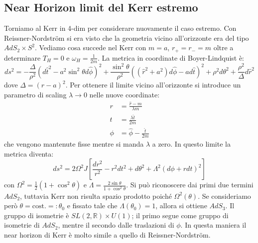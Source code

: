 \subsection{Near Horizon limit del Kerr estremo}
Torniamo al Kerr in 4-dim per considerare nuovamente il caso estremo. Con Reissner-Nordstr\"om si era visto che la geometria vicino all'orizzonte era del tipo $AdS_2 \times S^2$. Vediamo cosa succede nel Kerr con $m=a$, $r_+ =r_-= m$ oltre a determinare $T_H = 0$ e $\omega_H = \frac{1}{2m}$. La metrica in coordinate di Boyer-Lindquist è:
\begin{equation*}
    ds^2 = - \frac{\Delta}{\rho^2}\left(d\hat{t}^2 -a^2 \sin^2\theta d\hat{\phi}\right)^2 + \frac{\sin^2\theta}{\rho^2}\left((\hat{r}^2 + a^2)d\hat{\phi} - ad\hat{t} \right)^2 + \rho^2 d\theta^2 + \frac{\rho^2}{\Delta}d\hat{r}^2
\end{equation*}
dove $\Delta = (\hat{r} - a)^2$. Per ottenere il limite vicino all'orizzonte si introduce un parametro di scaling $\lambda\rightarrow 0$ nelle nuove coordinate:
\begin{align*}
    r &= \frac{\hat{r}-m}{\lambda m} \\
    t &= \frac{\lambda \hat{t}}{2m} \\
    \phi &= \hat{\phi} - \frac{\hat{t}}{2m}
\end{align*}
che vengono mantenute fisse mentre si manda $\lambda$ a zero. In questo limite la metrica diventa:
\begin{equation*}
    ds^2 = 2\Omega^2 J\left[ \frac{dr^2}{r^2}  - r^2dt^2 + d\theta^2 + \Lambda^2(d\phi +rdt)^2\right]
\end{equation*}
con $\Omega^2 = \frac{1}{2}(1+\cos^2\theta)$ e $\Lambda =\frac{2\sin\theta}{1+\cos^2\theta}$.
Si può riconoscere dai  primi due termini $AdS_2$, tuttavia Kerr non risulta spazio prodotto poiché $\Omega^2(\theta)$. Se consideriamo però $\theta = \textrm{cost.} =: \theta_0$ e fissato tale che $\Lambda(\theta_0) = 1$, allora si ottiene $AdS_3$.
Il gruppo di isometrie è $SL(2, \mathbb R) \times U(1)$; il primo segue come gruppo di isometrie di $AdS_2$, mentre il secondo dalle traslazioni di $\phi$. In questa maniera il near horizon di Kerr è molto simile a quello di Reissner-Nordstr\"om.